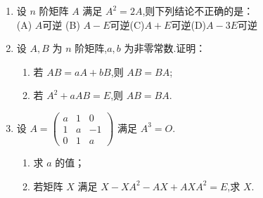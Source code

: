 \documentclass[12pt, a4paper, oneside, UTF8]{ctexbook}
\begin{document}
\begin{enumerate}[label=\arabic*.,start=4]
    \item 设 $ n $ 阶矩阵 $ A $ 满足 $ A^2 = 2A $,则下列结论不正确的是： \\
    (A) $A$可逆 \qquad (B) $A-E$可逆\qquad (C)$A+E$可逆\qquad (D)$A-3E$可逆 
    \begin{solution}
    \newpage
    \end{solution}
    
    \item 设 $ A, B $ 为 $ n $ 阶矩阵,$ a, b $ 为非零常数.证明：
    \begin{enumerate}
        \item 若 $ AB = aA + bB $,则 $ AB = BA $;
        \item 若 $ A^2 + aAB = E $,则 $ AB = BA $.
    \end{enumerate}
    
    \begin{solution}
    \newpage
    \end{solution}
    
    \item 设 
    $A = \begin{pmatrix}
    a & 1 & 0 \\
    1 & a & -1 \\
    0 & 1 & a
    \end{pmatrix}$
    满足 $ A^3 = O $.
    \begin{enumerate}
        \item 求 $ a $ 的值；
        \item 若矩阵 $ X $ 满足 $ X - XA^2 - AX + AXA^2 = E $,求 $ X $.
    \end{enumerate}
    
    \begin{solution}
    \newpage
    \end{solution}
\end{enumerate}
\end{document}
